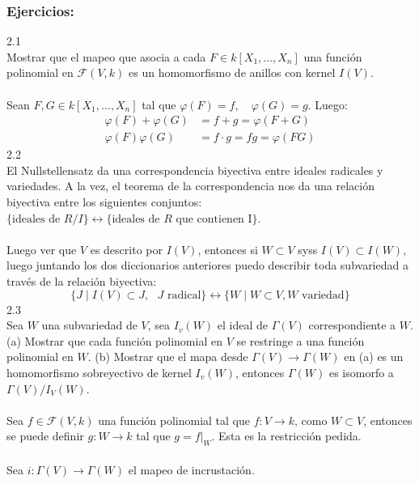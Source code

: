 \documentclass{article}
\begin{document}
\subsubsection*{Ejercicios:}
2.1
\\
Mostrar que el mapeo que asocia a cada $F \in k[X_1,\dots,X_n]$ una función polinomial en $\mathcal{F}(V,k)$ es un homomorfismo de anillos con kernel $I(V)$.
\\
\\
Sean $F,G \in k[X_1,\dots,X_n]$ tal que $\varphi(F)=f, \quad \varphi(G)=g$. Luego:
\begin{equation*}
\begin{aligned}
    \varphi(F)+\varphi(G)&=f+g=\varphi(F+G) \\
    \varphi(F)\varphi(G)&=f\cdot g=fg=\varphi(FG)
\end{aligned}
\end{equation*}
2.2
\\
El Nullstellensatz da una correspondencia biyectiva entre ideales radicales y variedades. A la vez, el teorema de la correspondencia nos da una relación biyectiva entre los siguientes conjuntos: $\{\text{ideales de } R/I \} \longleftrightarrow \{\text{ideales de } R \text{ que contienen I} \}$.
\\
\\
Luego ver que $V$ es descrito por $I(V)$, entonces si $W \subset V$ syss $I(V) \subset I(W)$, luego juntando los dos diccionarios anteriores puedo describir toda subvariedad a través de la relación biyectiva:
\begin{equation*}
    \{J\mid I(V) \subset J, \text{ } J \text{ radical} \} \longleftrightarrow \{W\mid W \subset V, W \text{ variedad} \}
\end{equation*}
2.3
\\
Sea $W$ una subvariedad de $V$, sea $I_v(W)$ el ideal de $\Gamma(V)$ correspondiente a $W$. (a) Mostrar que cada función polinomial en $V$ se restringe a una función polinomial en $W$. (b) Mostrar que el mapa desde $\Gamma(V) \to \Gamma(W)$ en (a) es un homomorfismo sobreyectivo de kernel $I_v(W)$, entonces $\Gamma(W)$ es isomorfo a $\Gamma(V)/I_V(W)$.
\\
\\
Sea $f \in \mathcal{F}(V,k)$ una función polinomial tal que $f:V\to k$, como $W \subset V$, entonces se puede definir $g: W \to k$ tal que $g=f|_{W}$. Esta es la restricción pedida.
\\
\\
Sea $i: \Gamma(V) \to \Gamma(W)$ el mapeo de incrustación.
\end{document}
